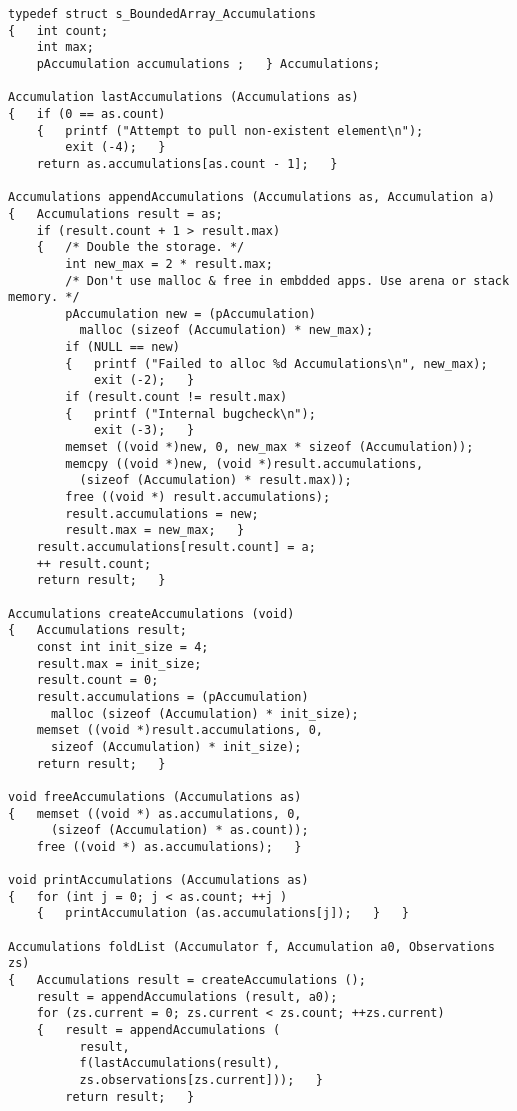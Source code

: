 \documentclass[10pt,oneside,x11names]{article}
\begin{document}
\begin{verbatim}
typedef struct s_BoundedArray_Accumulations
{   int count;
    int max;
    pAccumulation accumulations ;   } Accumulations;

Accumulation lastAccumulations (Accumulations as)
{   if (0 == as.count)
    {   printf ("Attempt to pull non-existent element\n");
        exit (-4);   }
    return as.accumulations[as.count - 1];   }

Accumulations appendAccumulations (Accumulations as, Accumulation a)
{   Accumulations result = as;
    if (result.count + 1 > result.max)
    {   /* Double the storage. */
        int new_max = 2 * result.max;
        /* Don't use malloc & free in embdded apps. Use arena or stack memory. */
        pAccumulation new = (pAccumulation)
          malloc (sizeof (Accumulation) * new_max);
        if (NULL == new)
        {   printf ("Failed to alloc %d Accumulations\n", new_max);
            exit (-2);   }
        if (result.count != result.max)
        {   printf ("Internal bugcheck\n");
            exit (-3);   }
        memset ((void *)new, 0, new_max * sizeof (Accumulation));
        memcpy ((void *)new, (void *)result.accumulations,
          (sizeof (Accumulation) * result.max));
        free ((void *) result.accumulations);
        result.accumulations = new;
        result.max = new_max;   }
    result.accumulations[result.count] = a;
    ++ result.count;
    return result;   }

Accumulations createAccumulations (void)
{   Accumulations result;
    const int init_size = 4;
    result.max = init_size;
    result.count = 0;
    result.accumulations = (pAccumulation)
      malloc (sizeof (Accumulation) * init_size);
    memset ((void *)result.accumulations, 0,
      sizeof (Accumulation) * init_size);
    return result;   }

void freeAccumulations (Accumulations as)
{   memset ((void *) as.accumulations, 0,
      (sizeof (Accumulation) * as.count));
    free ((void *) as.accumulations);   }

void printAccumulations (Accumulations as)
{   for (int j = 0; j < as.count; ++j )
    {   printAccumulation (as.accumulations[j]);   }   }

Accumulations foldList (Accumulator f, Accumulation a0, Observations zs)
{   Accumulations result = createAccumulations ();
    result = appendAccumulations (result, a0);
    for (zs.current = 0; zs.current < zs.count; ++zs.current)
    {   result = appendAccumulations (
          result,
          f(lastAccumulations(result),
          zs.observations[zs.current]));   }
        return result;   }
\end{verbatim}
\end{document}

